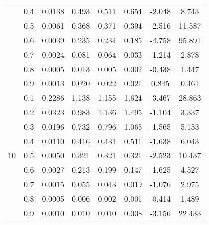 \documentclass[11pt,a4paper]{report}
\begin{document}
\begin{longtable}{ | c | c || c | c | c | c | c | c | }
 & 0.4 & 0.0138 & 0.493 & 0.511 & 0.654 & -2.048 & 8.743 \\
 & 0.5 & 0.0061 & 0.368 & 0.371 & 0.394 & -2.516 & 11.587 \\
 & 0.6 & 0.0039 & 0.235 & 0.234 & 0.185 & -4.758 & 95.891 \\
 & 0.7 & 0.0024 & 0.081 & 0.064 & 0.033 & -1.214 & 2.878 \\
 & 0.8 & 0.0005 & 0.013 & 0.005 & 0.002 & -0.438 & 1.447 \\
 & 0.9 & 0.0013 & 0.020 & 0.022 & 0.021 & 0.845 & 0.461 \\
 \hline
\multirow{9}{*}{10} & 0.1 & 0.2286 & 1.138 & 1.155 & 1.624 & -3.467 & 28.863 \\
 & 0.2 & 0.0323 & 0.983 & 1.136 & 1.495 & -1.104 & 3.337 \\
 & 0.3 & 0.0196 & 0.732 & 0.796 & 1.065 & -1.565 & 5.153 \\
 & 0.4 & 0.0110 & 0.416 & 0.431 & 0.511 & -1.638 & 6.043 \\
 & 0.5 & 0.0050 & 0.321 & 0.321 & 0.321 & -2.523 & 10.437 \\
 & 0.6 & 0.0027 & 0.213 & 0.199 & 0.147 & -1.625 & 4.527 \\
 & 0.7 & 0.0015 & 0.055 & 0.043 & 0.019 & -1.076 & 2.975 \\
 & 0.8 & 0.0005 & 0.006 & 0.002 & 0.001 & -0.414 & 1.489 \\
 & 0.9 & 0.0010 & 0.010 & 0.010 & 0.008 & -3.156 & 22.433 \\
 \hline
\hline
\end{longtable}
\end{document}

